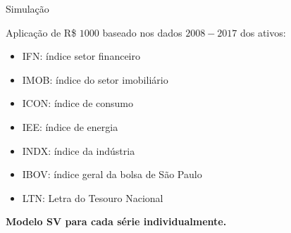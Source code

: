 \documentclass{beamer}
\begin{document}
 
 \begin{frame}{Simulação}


Aplicação de R\$ $1000$ baseado nos dados $2008-2017$ dos ativos:

\vspace{.25cm}
\begin{itemize}
\item IFN:  índice setor financeiro
\item IMOB: índice do setor imobiliário
\item ICON: índice de consumo
\item IEE:  índice de energia
\item INDX: índice da indústria
\item IBOV: índice geral da bolsa de São Paulo
\item LTN: Letra do Tesouro Nacional
\end{itemize}
\vspace{.25cm}

\textbf{Modelo SV para cada série individualmente.}
\end{frame}
\end{document}
